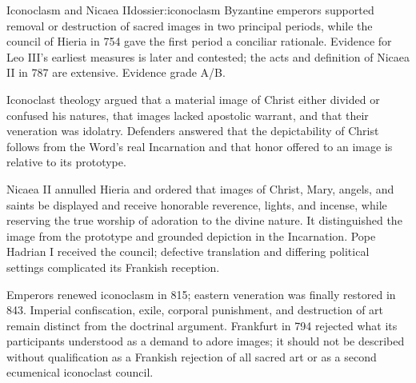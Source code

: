 \begin{heresydossier}{Iconoclasm and Nicaea II}{dossier:iconoclasm}
\objectfield Byzantine emperors supported removal or destruction of sacred images in two principal periods, while the council of Hieria in 754 gave the first period a conciliar rationale. Evidence for Leo III's earliest measures is later and contested; the acts and definition of Nicaea II in 787 are extensive. Evidence grade A/B.

\propositionfield Iconoclast theology argued that a material image of Christ either divided or confused his natures, that images lacked apostolic warrant, and that their veneration was idolatry. Defenders answered that the depictability of Christ follows from the Word's real Incarnation and that honor offered to an image is relative to its prototype.

\responsefield Nicaea II annulled Hieria and ordered that images of Christ, Mary, angels, and saints be displayed and receive honorable reverence, lights, and incense, while reserving the true worship of adoration to the divine nature. It distinguished the image from the prototype and grounded depiction in the Incarnation. Pope Hadrian I received the council; defective translation and differing political settings complicated its Frankish reception.

\aftermathfield Emperors renewed iconoclasm in 815; eastern veneration was finally restored in 843. Imperial confiscation, exile, corporal punishment, and destruction of art remain distinct from the doctrinal argument. Frankfurt in 794 rejected what its participants understood as a demand to adore images; it should not be described without qualification as a Frankish rejection of all sacred art or as a second ecumenical iconoclast council.
\end{heresydossier}

